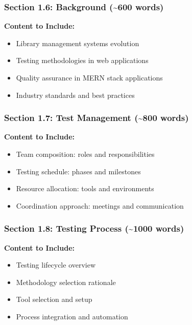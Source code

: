 \documentclass[12pt,a4paper]{article}
\begin{document}
\subsubsection{Section 1.6: Background (\textasciitilde600 words)}
\textbf{Content to Include:}
\begin{itemize}[leftmargin=*]
    \item Library management systems evolution
    \item Testing methodologies in web applications
    \item Quality assurance in MERN stack applications
    \item Industry standards and best practices
\end{itemize}

\subsubsection{Section 1.7: Test Management (\textasciitilde800 words)}
\textbf{Content to Include:}
\begin{itemize}[leftmargin=*]
    \item Team composition: roles and responsibilities
    \item Testing schedule: phases and milestones
    \item Resource allocation: tools and environments
    \item Coordination approach: meetings and communication
\end{itemize}

\subsubsection{Section 1.8: Testing Process (\textasciitilde1000 words)}
\textbf{Content to Include:}
\begin{itemize}[leftmargin=*]
    \item Testing lifecycle overview
    \item Methodology selection rationale
    \item Tool selection and setup
    \item Process integration and automation
\end{itemize}
\end{document}
